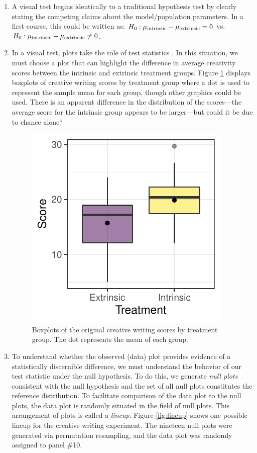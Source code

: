 \documentclass[12pt]{article}
\begin{document}
\begin{enumerate}
\def\labelenumi{\arabic{enumi}.}
\item
  A visual test begins identically to a traditional hypothesis test by
  clearly stating the competing claims about the model/population
  parameters. In a first course, this could be written as:
  \(H_0: \mu_{\rm intrinsic} - \mu_{\rm extrinsic} = 0\)
  vs.~\(H_0: \mu_{\rm intrinsic} - \mu_{\rm extrinsic} \ne 0\).
\item
  In a visual test, plots take the role of test statistics
  \citep{Buja-2009bd}. In this situation, we must choose a plot that can
  highlight the difference in average creativity scores between the
  intrinsic and extrinsic treatment groups. Figure \ref{fig:data_plot}
  displays boxplots of creative writing scores by treatment group where
  a dot is used to represent the sample mean for each group, though
  other graphics could be used. There is an apparent difference in the
  distribution of the scores---the average score for the intrinsic group
  appears to be larger---but could it be due to chance alone?

  \begin{figure}
  \centering
  \includegraphics{figs/diff_means_plot.pdf}
  \caption{\label{fig:data_plot} Boxplots of the original creative
  writing scores by treatment group. The dot represents the mean of each
  group.}
  \end{figure}
\item
  To understand whether the observed (data) plot provides evidence of a
  statistically discernible difference, we must understand the behavior
  of our test statistic under the null hypothesis. To do this, we
  generate \emph{null plots} consistent with the null hypothesis and the
  set of all null plots constitutes the reference distribution. To
  facilitate comparison of the data plot to the null plots, the data
  plot is randomly situated in the field of null plots. This arrangement
  of plots is called a \emph{lineup}. Figure \ref{fig:lineup} shows one
  possible lineup for the creative writing experiment. The nineteen null
  plots were generated via permutation resampling, and the data plot was
  randomly assigned to panel \#10.


\end{enumerate}
\end{document}
